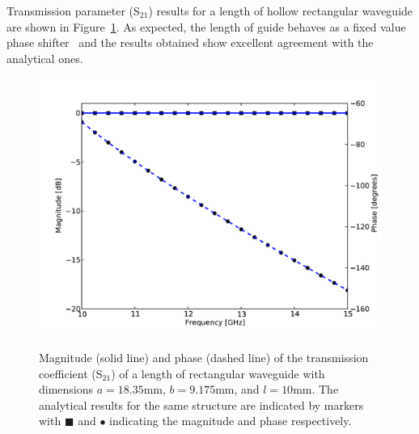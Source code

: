 Transmission parameter (S$_{21}$) results for a length of hollow
rectangular waveguide are shown in
Figure~\ref{lezar:fig:hollow_h_plane_S_parameters}. As expected, the length
of guide behaves as a fixed value phase shifter~\cite{PelosiCoccioliSelleri1998} and
the results obtained show excellent agreement with the analytical
ones.
\begin{figure}
 \centering
 \includegraphics[width=\largefig]{chapters/lezar/pdf/hollow_h_plane_S_parameters.pdf}
 \caption{Magnitude (solid line) and phase (dashed line) of the transmission coefficient (S$_{21}$) of a length of rectangular waveguide with dimensions $a=18.35\text{mm}$, $b=9.175\text{mm}$, and $l = 10\text{mm}$. The analytical results for the same structure are indicated by markers with $\blacksquare$ and $\bullet$ indicating the magnitude and phase respectively.}
 \label{lezar:fig:hollow_h_plane_S_parameters}
\end{figure}

